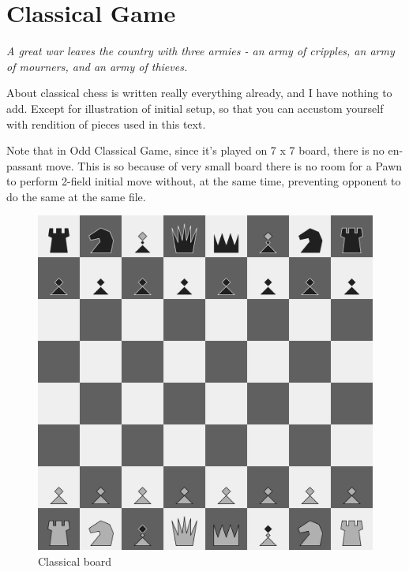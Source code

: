 \documentclass[a5paper,12pt,draft]{book} %
\begin{document}
\chapter*{Classical Game}

\begin{flushright}
\parbox{0.8\textwidth}{
\emph{A great war leaves the country with three armies -
an army of cripples, an army of mourners, and an army of thieves. \\
 } }
\end{flushright}

\noindent
About classical chess is written really everything already, and I
have nothing to add. Except for illustration of initial setup, so that
you can accustom yourself with rendition of pieces used in this text.

Note that in Odd Classical Game, since it's played on 7 x 7 board,
there is no en-passant move. This is so because of very small board
there is no room for a Pawn to perform 2-field initial move without,
at the same time, preventing opponent to do the same at the same file.

\noindent
\begin{figure}[t]
\includegraphics[width=1.0\textwidth, keepaspectratio=true]{../gfx/boards/02_classical.png}
\caption{Classical board}
\label{fig:classical_chess}
\end{figure}
\end{document}
